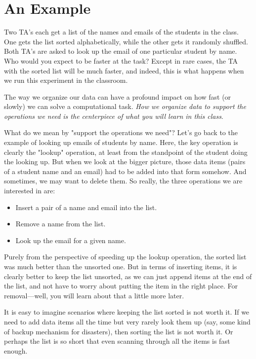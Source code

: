 \section{An Example}

\begin{displayquote}
Two TA's each get a list of the names and emails of the students in the class.
One gets the list sorted alphabetically, while the other gets it randomly shuffled.
Both TA's are asked to look up the email of one particular student by name.
Who would you expect to be faster at the task?
Except in rare cases, the TA with the sorted list will be much faster, and indeed, this is what happens when we run this experiment in the classroom. 
\end{displayquote}

The way we organize our data can have a profound impact on how fast (or slowly) we can solve a computational task. 
\emph{How we organize data to support the operations we need is the centerpiece of what you will learn in this class}.

What do we mean by "support the operations we need"?
Let's go back to the example of looking up emails of students by name.
Here, the key operation is clearly the "lookup" operation, at least from the standpoint of the student doing the looking up.
But when we look at the bigger picture, those data items (pairs of a student name and an email) had to be added into that form somehow.
And sometimes, we may want to delete them.
So really, the three operations we are interested in are:

\begin{itemize}
\item Insert a pair of a name and email into the list.
\item Remove a name from the list.
\item Look up the email for a given name.
\end{itemize}

Purely from the perspective of speeding up the lookup operation, the sorted list was much better than the unsorted one.
But in terms of inserting items, it is clearly better to keep the list unsorted, as we can just append items at the end of the list, and not have to worry about putting the item in the right place.
For removal---well, you will learn about that a little more later.

It is easy to imagine scenarios where keeping the list sorted is not worth it.
If we need to add data items all the time but very rarely look them up (say, some kind of backup mechanism for disasters), then sorting the list is not worth it.
Or perhaps the list is so short that even scanning through all the items is fast enough.

